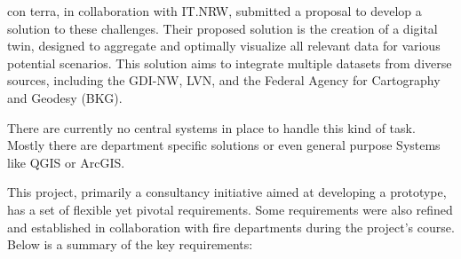 \documentclass[11pt, titlepage, a4paper]{article}
\begin{document}
con terra, in collaboration with IT.NRW, submitted a proposal to develop a solution to these challenges. Their proposed solution is the creation of a digital twin, designed to aggregate and optimally visualize all relevant data for various potential scenarios. This solution aims to integrate multiple datasets from diverse sources, including the GDI-NW, LVN, and the Federal Agency for Cartography and Geodesy (BKG).


There are currently no central systems in place to handle this kind of task. Mostly there are department specific solutions or even general purpose Systems like QGIS or ArcGIS.

This project, primarily a consultancy initiative aimed at developing a prototype, has a set of flexible yet pivotal requirements. Some requirements were also refined and established in collaboration with fire departments during the project's course. Below is a summary of the key requirements:
\end{document}
